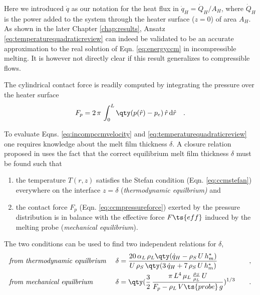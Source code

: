Here we introduced $\Dot{q}$ as our notation for the heat flux in $\Dot{q}_H=\Dot{Q}_H / A_H$, where $\Dot{Q}_H$ is the power added to the system through the heater surface ($z=0$) of area $A_H$.
As shown in the later Chapter \ref{chap:results}, Ansatz \ref{eq:temperaturequadraticreview} can indeed be validated to be an accurate approximation to the real solution of Eqn. \ref{eq:energyccm} in incompressible melting. It is however not directly clear if this result generalizes to compressible flows. 

The cylindrical contact force is readily computed by integrating the pressure over the heater surface
\begin{equation}\label{eq:ccmpressureforce}
    F_p = 2\,\pi\,\int_0^L \qty(p(\hat{r})-p_e)\,\hat{r}\, \mathrm{d}\hat{r} \quad .
\end{equation}

To evaluate Eqns. \ref{eq:incompccmvelocity} and \ref{eq:temperaturequadraticreview} one requires knowledge about the melt film thickness $\delta$. A closure relation proposed in \cite{schuller2019icarus} uses the fact that the correct equilibrium melt film thickness $\delta$ must be found such that 
\begin{enumerate}

    \item the temperature $T(r, z)$ satisfies the Stefan condition (Eqn. \ref{eq:ccmstefan}) everywhere on the interface $z=\delta$ (\textit{thermodynamic equilbrium)} and
    \item the contact force $F_p$ (Eqn. \ref{eq:ccmpressureforce}) exerted by the pressure  distribution is in balance with the effective force $F\ts{eff}$ induced by the melting probe (\textit{mechanical equilibrium}).  
\end{enumerate}

The two conditions can be used to find two independent relations for $\delta$,
\begin{subequations}
\begin{flalign}
     & \textit{from thermodynamic equilbrium } && \delta= \frac{20\,\alpha_L\,\rho_L\qty(\Dot{q}_H-\rho_S\,U\,h_m^*)}{U\,\rho_S\,\qty(3\,\Dot{q}_H + 7\,\rho_S\,U\,h_m^*)} & \quad , \label{eq:ccmdeltathermodynamic}\\
     & \textit{from mechanical equilbrium } && \delta= \qty(\frac{3}{2}\,\frac{\pi\,L^4\,\mu_L\,\frac{\rho_S}{\rho_L}\,U}{F_p - \rho_L\,V\ts{probe}\,g})^{1/3}& \quad .
\end{flalign}
\end{subequations}

